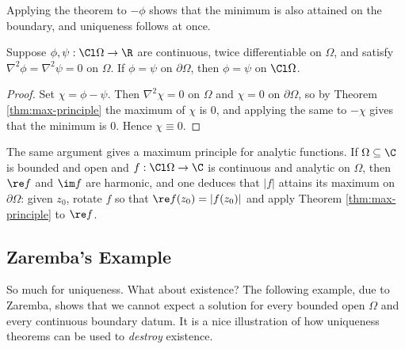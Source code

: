 Applying the theorem to $-\phi$ shows that the minimum is also attained on the boundary, and uniqueness follows at once.

\begin{theorem}\label{thm:dirichlet-unique}
	Suppose $\phi,\psi : \Cl\Omega \to \R$ are continuous, twice differentiable on $\Omega$, and satisfy $\nabla^2\phi = \nabla^2\psi = 0$ on $\Omega$. If $\phi = \psi$ on $\partial\Omega$, then $\phi = \psi$ on $\Cl\Omega$.
\end{theorem}

\begin{proof}
	Set $\chi = \phi-\psi$. Then $\nabla^2 \chi = 0$ on $\Omega$ and $\chi = 0$ on $\partial\Omega$, so by Theorem \ref{thm:max-principle} the maximum of $\chi$ is $0$, and applying the same to $-\chi$ gives that the minimum is $0$. Hence $\chi \equiv 0$.
\end{proof}

\begin{remark}
	The same argument gives a maximum principle for analytic functions. If $\Omega \subseteq \C$ is bounded and open and $f : \Cl\Omega \to \C$ is continuous and analytic on $\Omega$, then $\re f$ and $\im f$ are harmonic, and one deduces that $|f|$ attains its maximum on $\partial\Omega$: given $z_0$, rotate $f$ so that $\re f(z_0) = |f(z_0)|$ and apply Theorem \ref{thm:max-principle} to $\re f$.
\end{remark}

\subsection{Zaremba's Example}

So much for uniqueness. What about existence? The following example, due to Zaremba, shows that we cannot expect a solution for every bounded open $\Omega$ and every continuous boundary datum. It is a nice illustration of how uniqueness theorems can be used to \emph{destroy} existence.

